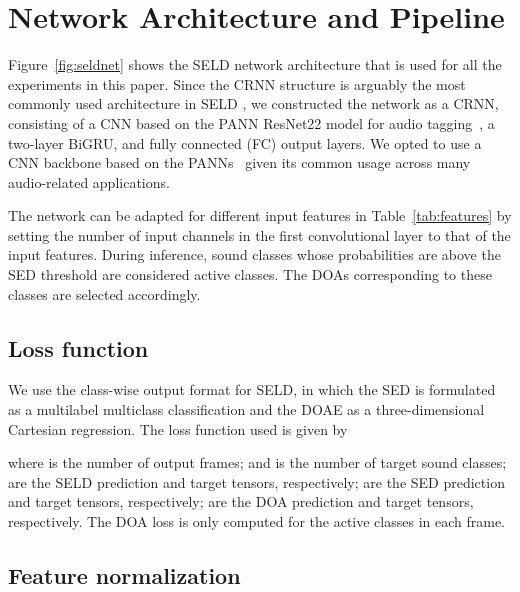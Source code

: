 \documentclass[journal]{IEEEtran}
\begin{document}
 \section{Network Architecture and Pipeline}
\label{sec:net}

Figure~\ref{fig:seldnet} shows the SELD network architecture that is used for all the experiments in this paper. Since the CRNN structure is arguably the most commonly used architecture in SELD \cite{Adavanne2019SoundNetworks, Cao2019PolyphonicStrategy, Nguyen2020ADetection, Xue2020SoundLearning, Shimada2021ACCDOA:Detection, Sato2021AmbisonicEquivariance, Phan2020OnLocalization, Park2020SoundFunctions, Emmanuel2021Multi-scaleDetection, Kapka2019SoundModels, Wang2020TheChallenge, Shimada2021EnsembleDetection, Nguyen2021DCASEDetection}, we constructed the network as a CRNN, consisting of a CNN based on the PANN ResNet22 model for audio tagging~\cite{Kong2020PANNs:Recognition}, a two-layer BiGRU, and fully connected (FC) output layers. We opted to use a CNN backbone based on the PANNs~\cite{Kong2020PANNs:Recognition} given its common usage across many audio-related applications.

The network can be adapted for different input features in Table~\ref{tab:features} by setting the number of input channels in the first convolutional layer to that of the input features. During inference, sound classes whose probabilities are above the SED threshold are considered active classes. The DOAs corresponding to these classes are selected accordingly.

\subsection{Loss function}

We use the class-wise output format for SELD, in which the SED is formulated as a multilabel multiclass classification and the DOAE as a three-dimensional Cartesian regression. The loss function used is given by 

where  is the number of output frames; and  is the number of target sound classes;  are the SELD prediction and target tensors, respectively;  are the SED prediction and target tensors, respectively;  are the DOA prediction and target tensors, respectively. The DOA loss is only computed for the active classes in each frame.  

\subsection{Feature normalization}
\end{document}
